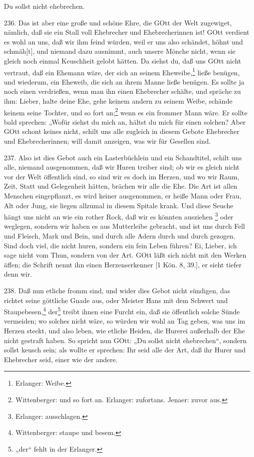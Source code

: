 \begin{schriftzitat}
Du sollst nicht ehebrechen.
\end{schriftzitat}

236. Das ist aber eine große und schöne Ehre, die GOtt der Welt zugewiget, nämlich, daß sie ein Stall voll Ehebrecher und Ehebrecherinnen ist! GOtt verdient es wohl an uns, daß wir ihm feind würden, weil er uns also schändet, höhnt und schmäh[t], und niemand dazu ausnimmt, auch unsere Mönche nicht, wenn sie gleich noch einmal Keuschheit gelobt hätten. Da siehst du, daß uns GOtt nicht vertraut, daß ein Ehemann wäre, der sich an seinem Eheweibe,\footnote{Erlanger: Weibe.} ließe benügen, und wiederum, ein Eheweib, die sich an ihrem Manne ließe benügen. Es sollte ja noch einen verdrießen, wenn man ihn einen Ehebrecher schälte, und spräche zu ihm: Lieber, halte deine Ehe, gehe keinem andern zu seinem Weibe, schände keinem seine Tochter, und so fort an;\footnote{Wittenberger: und so fort an. Erlanger: zufortans. Jenaer: zuvor aus.} wenn es ein frommer Mann wäre. Er sollte bald sprechen: „Wofür siehst du mich an, hältst du mich für einen solchen? Aber GOtt schont keines nicht, schilt uns alle zugleich in diesem Gebote Ehebrecher und Ehebrecherinnen; will damit anzeigen, was wir für Gesellen sind.

237. Also ist dies Gebot auch ein Lasterbüchlein und ein Schandtitel, schilt uns alle, niemand ausgenommen, daß wir Huren treiber sind; ob wir es gleich nicht vor der Welt öffentlich sind, so sind wir es doch im Herzen, und wo wir Raum, Zeit, Statt und Gelegenheit hätten, brächen wir alle die Ehe. Die Art ist allen Menschen eingepflanzt, es wird keiner ausgenommen, er heiße Mann oder Frau, Alt oder Jung, sie liegen allzumal in diesem Spitale krank. Und diese Seuche hängt uns nicht an wie ein rother Rock, daß wir es könnten ausziehen
\footnote{Erlanger: ausschlagen.} oder weglegen, sondern wir haben es aus Mutterleibe gebracht, und ist uns durch Fell und Fleisch, Mark und Bein, und durch alle Adern durch und durch gezogen. Sind doch viel, die nicht huren, sondern ein fein Leben führen? Ei, Lieber, ich sage nicht vom Thun, sondern von der Art. GOtt läßt sich nicht mit den Werken äffen; die Schrift nennt ihn einen Herzenserkenner [1 Kön. 8, 39.], er sieht tiefer denn wir.

238. Daß nun etliche fromm sind, und wider dies Gebot nicht sündigen, das richtet seine göttliche Gnade aus, oder Meister Hans mit dem Schwert und Staupebesen,\footnote{Wittenberger: staupe und besem.} der\footnote{„der“ fehlt in der Erlanger.} treibt ihnen eine Furcht ein, daß sie öffentlich solche Sünde vermeiden; wo solches nicht wäre, so würden wir wohl an Tag geben, was uns im Herzen steckt, und also leben, wie etliche Heiden, die Hurerei außerhalb der Ehe nicht gestraft haben. So spricht nun GOtt: „Du sollst nicht ehebrechen“, sondern sollst keusch sein; als wollte er sprechen: Ihr seid alle der Art, daß ihr Hurer und Ehebrecher seid, einer wie der andere.

